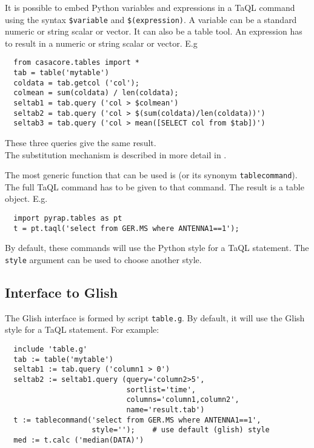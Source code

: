   It is possible to embed Python variables and expressions in a TaQL
  command using the syntax \texttt{\$variable} and
  \texttt{\$(expression)}. A variable can be a standard numeric or
  string scalar or vector. It can also be a table tool.
  An expression has to result in a numeric or string scalar or vector.
  E.g
\begin{verbatim}
  from casacore.tables import *
  tab = table('mytable')
  coldata = tab.getcol ('col');
  colmean = sum(coldata) / len(coldata);
  seltab1 = tab.query ('col > $colmean')
  seltab2 = tab.query ('col > $(sum(coldata)/len(coldata))')
  seltab3 = tab.query ('col > mean([SELECT col from $tab])')
\end{verbatim}
  These three queries give the same result.
  \\The substitution mechanism is described in more detail in
  .

  The most generic function that can be used is
  (or its synonym \texttt{tablecommand}).
  The full TaQL command has to be given to that command. The result is
  a table object. E.g.
\begin{verbatim}
  import pyrap.tables as pt
  t = pt.taql('select from GER.MS where ANTENNA1==1');
\end{verbatim}  

  By default, these commands will use the Python style for a TaQL
  statement. The \texttt{style} argument can be used
  to choose another style.

\subsection{Interface to Glish}
  The Glish interface is formed by script \texttt{table.g}.
  By default, it will use the Glish style for a TaQL
  statement.
  For example:
\begin{verbatim}
  include 'table.g'
  tab := table('mytable')
  seltab1 := tab.query ('column1 > 0')
  seltab2 := seltab1.query (query='column2>5',
                            sortlist='time',
                            columns='column1,column2',
                            name='result.tab')
  t := tablecommand('select from GER.MS where ANTENNA1==1',
                    style='');    # use default (glish) style
  med := t.calc ('median(DATA)')
\end{verbatim}

